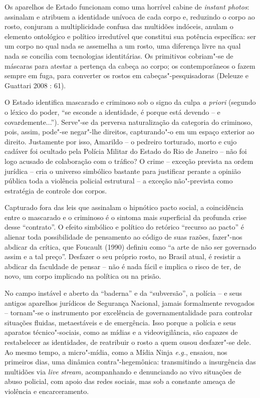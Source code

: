 Os aparelhos de Estado funcionam como uma horrível cabine de
\emph{instant photos}: assinalam e atribuem a identidade unívoca de cada
corpo e, reduzindo o corpo ao rosto, conjuram a multiplicidade confusa
das multidões indóceis, anulam o elemento ontológico e político
irredutível que constitui sua potência específica: ser um corpo no qual
nada se assemelha a um rosto, uma diferença livre na qual nada se
concilia com tecnologias identitárias. Os primitivos cobriam"-se de
máscaras para atestar a pertença da cabeça ao corpo; os contemporâneos o
fazem sempre em fuga, para converter os rostos em cabeças"-pesquisadoras
(Deleuze e Guattari 2008 : 61).

O Estado identifica mascarado e criminoso sob o signo da culpa \emph{a
priori }(segundo o léxico do poder, ``se esconde a identidade, é porque
está devendo -- e covardemente...''). Serve"-se da perversa naturalização
da categoria do criminoso, pois, assim, pode"-se negar"-lhe direitos,
capturando"-o em um espaço exterior ao direito. Justamente por isso,
Amarildo -- o pedreiro torturado, morto e cujo cadáver foi ocultado pela
Polícia Militar do Estado do Rio de Janeiro -- não foi logo acusado de
colaboração com o tráfico? O crime -- exceção prevista na ordem jurídica
-- cria o universo simbólico bastante para justificar perante a opinião
pública toda a violência policial estrutural -- a exceção não"-prevista
como estratégia de controle dos corpos.

Capturado fora das leis que assinalam o hipnótico pacto social, a
coincidência entre o mascarado e o criminoso é o sintoma mais
superficial da profunda crise desse ``contrato''. O efeito simbólico e
político do retórico ``recurso ao pacto'' é alienar toda possibilidade
de pensamento ao código de suas razões, fazer"-nos abdicar da crítica,
que Foucault (1990) definiu como ``a arte de não ser governado assim e a
tal preço''. Desfazer o seu próprio rosto, no Brasil atual, é resistir a
abdicar da faculdade de pensar -- não é nada fácil e implica o risco de
ter, de novo, um corpo implicado na política ou na prisão.

No campo instável e aberto da ``baderna'' e da ``subversão'', a polícia
-- e seus antigos aparelhos jurídicos de Segurança Nacional, jamais
formalmente revogados -- tornam"-se o instrumento por excelência de
governamentalidade para controlar situações fluidas, metaestáveis e de
emergência. Isso porque a polícia e seus aparatos técnico"-sociais, como
as mídias e a videovigilância, são capazes de restabelecer as
identidades, de reatribuir o rosto a quem ousou desfazer"-se dele. Ao
mesmo tempo, a micro"-mídia, como a Mídia Ninja \emph{e.g.}, ensaiou, nos
primeiros dias, uma dinâmica contra"-hegemônica: transmitindo a
insurgência das multidões via \emph{live stream, }acompanhando e
denunciando ao vivo situações de abuso policial, com apoio das redes
sociais, mas sob a constante ameaça de violência e encarceramento.

